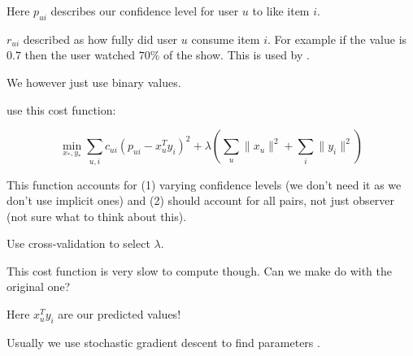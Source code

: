 Here $p_{ui}$ describes our confidence level for user $u$ to like item $i$.

$r_{ui}$ described as how fully did user $u$ consume item $i$. For example if the value is $0.7$ then the user watched $70\%$ of the show. This is used by \cite{Yifan:2008}.

We however just use binary values.

\cite{Yifan:2008} use this cost function:

\begin{equation}
    \min_{x_*, y_*} \sum_{u,i} c_{ui} (p_{ui} - x_{u}^T y_i)^2 + \lambda(\sum_{u} \|x_u\|^2 + \sum_{i} \|y_i\|^2)
\end{equation}

This function accounts for (1) varying confidence levels (we don't need it as we don't use implicit ones) and (2) should account for all pairs, not just observer (not sure what to think about this).

Use cross-validation to select $\lambda$.

This cost function is very slow to compute though. Can we make do with the original one?

Here $x_{u}^T y_i$ are our predicted values!

Usually we use stochastic gradient descent to find parameters \cite{Yifan:2008}.

